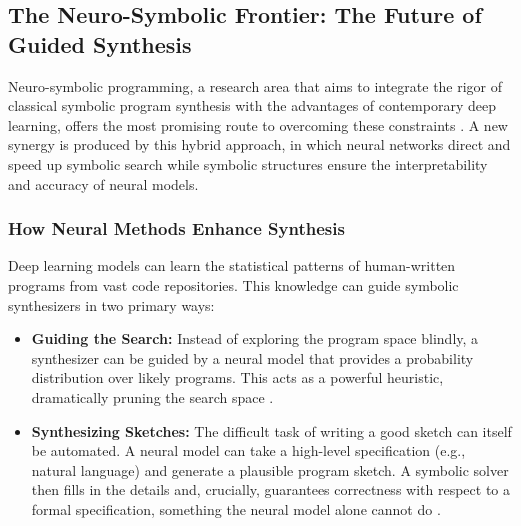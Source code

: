 \documentclass[12pt, a4paper]{report}
\begin{document}
\subsection{The Neuro-Symbolic Frontier: The Future of Guided Synthesis}
Neuro-symbolic programming, a research area that aims to integrate the rigor of classical symbolic program synthesis with the advantages of contemporary deep learning, offers the most promising route to overcoming these constraints \citep{solar2008program}. A new synergy is produced by this hybrid approach, in which neural networks direct and speed up symbolic search while symbolic structures ensure the interpretability and accuracy of neural models.

\subsubsection{How Neural Methods Enhance Synthesis}
Deep learning models can learn the statistical patterns of human-written programs from vast code repositories. This knowledge can guide symbolic synthesizers in two primary ways:
\begin{itemize}
    \item \textbf{Guiding the Search:} Instead of exploring the program space blindly, a synthesizer can be guided by a neural model that provides a probability distribution over likely programs. This acts as a powerful heuristic, dramatically pruning the search space \citep{singh2018interpretable}.
    \item \textbf{Synthesizing Sketches:} The difficult task of writing a good sketch can itself be automated. A neural model can take a high-level specification (e.g., natural language) and generate a plausible program sketch. A symbolic solver then fills in the details and, crucially, guarantees correctness with respect to a formal specification, something the neural model alone cannot do \citep{balog2017deepcoder}.
\end{itemize}
\end{document}

